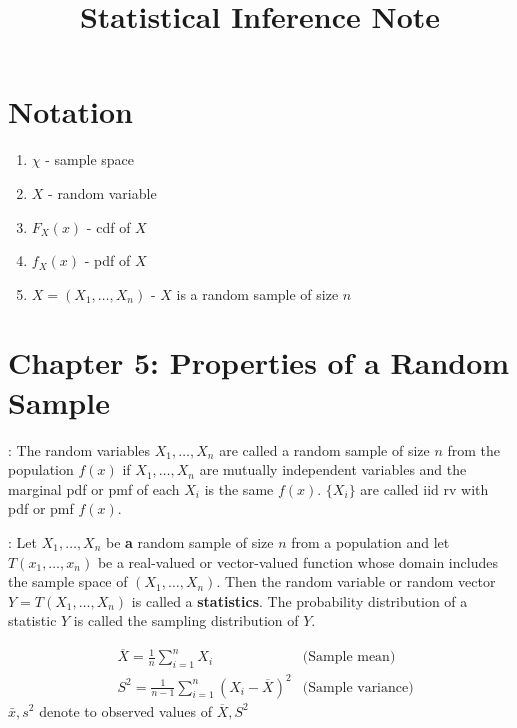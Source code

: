 \documentclass[12pt]{article}
\title{Statistical Inference Note}
\begin{document}
\maketitle
\section*{Notation}
\begin{multicols}{2}
	\begin{enumerate}
		\item $\chi$ - sample space
		\item $X$ - random variable
		\item $F_X(x)$ - cdf of $X$
		\item $f_X(x)$ - pdf of $X$
		\item $X =(X_1, \ldots, X_n)$ - $X$ is a random sample of size $n$
	\end{enumerate}
\end{multicols}

\section*{Chapter 5: Properties of a Random Sample}

\begin{definition}: The random variables $X_1, \ldots, X_n$ are called a random sample of size $n$ from the population $f(x)$ if $X_1,\ldots, X_n$ are mutually independent variables and the marginal pdf or pmf of each $X_i$ is the same $f(x)$. $\{X_i\}$ are called iid rv with pdf or pmf $f(x)$.
\end{definition}

\begin{definition}[Statistics]: Let $X_1,\ldots,X_n$ be \textbf{a} random sample of size $n$ from a population and let $T(x_1, \ldots, x_n)$ be a real-valued or vector-valued function whose domain includes the sample space of $(X_1, \ldots, X_n)$. Then the random variable or random vector $Y = T(X_1, \ldots , X_n)$ is called a \textbf{statistics}. The probability distribution of a statistic $Y$ is called the sampling distribution of $Y$.
\end{definition}

\begin{definition}
	\begin{align*}
		&\overline{X} = \frac{1}{n} \sum^{n}_{i=1} X_i &\text{(Sample mean)} \\
		&S^2 = \frac{1}{n-1} \sum^{n}_{i=1} (X_i - \overline{X})^2 &\text{(Sample variance)}
	\end{align*}
$\bar{x}, s^2$ denote to observed values of $\overline{X}, S^2$
\end{definition}
\end{document}
